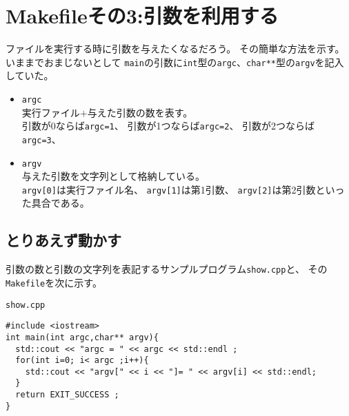  \section{Makefileその3:引数を利用する}
 
 
 ファイルを実行する時に引数を与えたくなるだろう。
 その簡単な方法を示す。
 いままでおまじないとして
 \verb|main|の引数に\verb|int|型の\verb|argc|、\verb|char**|型の\verb|argv|を記入していた。
 \begin{itemize}
  \item \verb|argc| \\
	実行ファイル$+$与えた引数の数を表す。 \\
	引数が0ならば\verb|argc=1|、
	引数が1つならば\verb|argc=2|、
	引数が2つならば\verb|argc=3|、
	
  \item \verb|argv| \\
	与えた引数を文字列として格納している。\\
	\verb|argv[0]|は実行ファイル名、
	\verb|argv[1]|は第1引数、
	\verb|argv[2]|は第2引数といった具合である。
 \end{itemize}
 
 
 
  \subsection{とりあえず動かす}
  
  引数の数と引数の文字列を表記するサンプルプログラム\texttt{show.cpp}と、
  その\texttt{Makefile}を次に示す。
  \begin{itembox}{\texttt{show.cpp}}
\begin{verbatim}
#include <iostream>
int main(int argc,char** argv){
  std::cout << "argc = " << argc << std::endl ;
  for(int i=0; i< argc ;i++){
    std::cout << "argv[" << i << "]= " << argv[i] << std::endl;
  }
  return EXIT_SUCCESS ;
}
\end{verbatim}
  \end{itembox}
  
